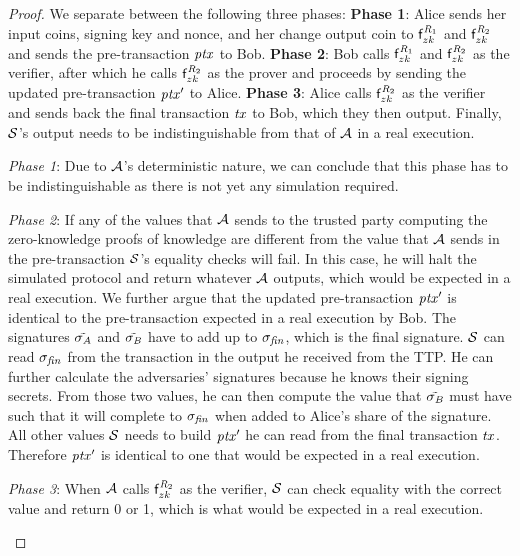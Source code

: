 \begin{proof}
    We separate between the following three phases:
    \textbf{Phase 1}: Alice sends her input coins, signing key and nonce, and her change output coin to $\mathsf{f}^{\mathit{R}_1}_{zk}$ and $\mathsf{f}^{\mathit{R}_2}_{zk}$ and sends the pre-transaction $\mathit{ptx}$ to Bob.
    \textbf{Phase 2}: Bob calls $\mathsf{f}^{\mathit{R}_1}_{zk}$ and $\mathsf{f}^{\mathit{R}_2}_{zk}$ as the verifier, after which he calls $\mathsf{f}^{\mathit{R}_2}_{zk}$ as the prover and proceeds by sending the updated pre-transaction ${\mathit{ptx}}'$ to Alice.
    \textbf{Phase 3}: Alice calls $\mathsf{f}^{\mathit{R}_2}_{zk}$ as the verifier and sends back the final transaction $\mathit{tx}$ to Bob, which they then output.
    Finally, $\mathcal{S}$'s output needs to be indistinguishable from that of $\mathcal{A}$ in a real execution.
    \begin{asparaitem}
        \item \textit{Phase 1}: Due to $\mathcal{A}$'s deterministic nature, we can conclude that this phase has to be indistinguishable as there is not yet any simulation required.
        \item \textit{Phase 2}: If any of the values that $\mathcal{A}$ sends to the trusted party computing the zero-knowledge proofs of knowledge are different from the value that $\mathcal{A}$ sends in the pre-transaction $\mathcal{S}$'s equality checks will fail.
        In this case, he will halt the simulated protocol and return whatever $\mathcal{A}$ outputs, which would be expected in a real execution.
        We further argue that the updated pre-transaction ${\mathit{ptx}}'$ is identical to the pre-transaction expected in a real execution by Bob.
        The signatures $\tilde{\sigma_{\mathit{A}}}$ and $\tilde{\sigma_{\mathit{B}}}$ have to add up to $\sigma_{\mathit{fin}}$, which is the final signature.
        $\mathcal{S}$ can read $\sigma_{\mathit{fin}}$ from the transaction in the output he received from the TTP.
        He can further calculate the adversaries' signatures because he knows their signing secrets.
        From those two values, he can then compute the value that $\tilde{\sigma_{\mathit{B}}}$ must have such that it will complete to $\sigma_{\mathit{fin}}$ when added to Alice's share of the signature.
        All other values $\mathcal{S}$ needs to build ${\mathit{ptx}}'$ he can read from the final transaction $\mathit{tx}$.
        Therefore ${\mathit{ptx}}'$ is identical to one that would be expected in a real execution.
        \item \textit{Phase 3}: When $\mathcal{A}$ calls $\mathsf{f}^{\mathit{R}_2}_{zk}$ as the verifier, $\mathcal{S}$ can check equality with the correct value and return 0 or 1, which is what would be expected in a real execution.
    \end{asparaitem}



\end{proof}
